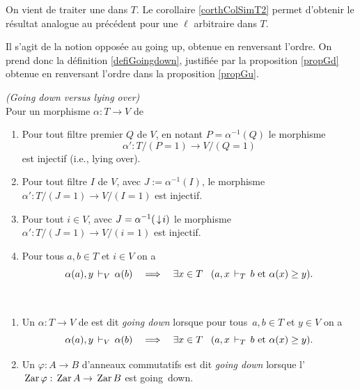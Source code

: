 On vient de traiter une  dans $T$. Le corollaire \ref{corthColSimT2} permet d'obtenir le résultat analogue au précédent pour  une \prolo $\ell$ arbitraire dans $T$.

\label{subsecGd}

Il s'agit de la notion opposée au going up, obtenue en renversant l'ordre.
On prend donc la définition \ref{defiGoingdown}, justifiée par la proposition
\ref{propGd} obtenue en renversant l'ordre dans la proposition
\ref{propGu}.

\begin{proposition} \label{propGd} \emph{(Going down versus lying over)}
\\
Pour un morphisme $\alpha:T\to V$ de \trdis \propeq
%
\begin{enumerate}
%
\item Pour tout filtre premier $Q$ de $V$, en notant $P=\alpha^{-1}(Q)$ le morphisme 
$$\alpha':T/(P=1)\to V/(Q=1)$$ est injectif (i.e., lying over).
%
\item Pour tout filtre $I$ de $V$, avec $J:=\alpha^{-1}(I)$, le morphisme $\alpha':T/(J=1)\to V/(I=1)$ est injectif. 
%
\item Pour tout $i\in V$, avec $J=\alpha^{-1}(\,\downarrow\! i)$ le morphisme $\alpha':T/(J=1)\to V/(i=1)$ est injectif. 
%
\item Pour
tous $a,b\in T$ et $i\in V$ on a
$$
\alpha(a), y\,\vdash_{V}\, \alpha(b) \quad\Longrightarrow\quad\exists x\in T\;\;\; (a , x \,\vdash_{T}\, b\hbox{ et }\alpha(x)\geq y).
$$
\end{enumerate} 
\end{proposition}


\begin{definition}\label{defiGoingdown}~
\begin{enumerate}
%
\item Un \homo $\alpha:T\to V$ de \trdis est dit \emph{going down}
lorsque  pour
\hbox{tous $a,b\in T$} et $y\in V$ on a
$$
\alpha(a), y\,\vdash_{V}\, \alpha(b) \quad\Longrightarrow\quad\exists x\in T\;\;\; (a , x \,\vdash_{T}\, b\hbox{ et }\alpha(x)\geq y).
$$

%
\item Un \homo $\varphi: A\to B$ d'anneaux
commutatifs est dit \emph{going down} lorsque
l'\homo  $\,{\rm Zar}\,\varphi:\,{\rm Zar}\, A\to\,{\rm Zar}\, B$ est going~down.
\end{enumerate}
\end{definition} 

